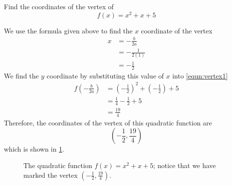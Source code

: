 \begin{myexample}
Find the coordinates of the vertex of
\begin{equation}\label{equn:vertex1}
	f(x) = x^2+x+5
\end{equation}
{}
\end{myexample}
\begin{myProof}
	We use the formula given above to find the $x$ coordinate of the vertex
	\begin{align*}
		x & =  - \frac{b}{2a}   \\
		  & =  - \frac{1}{2(1)} \\
		  & =  -\frac{1}{2}     
	\end{align*} 
	We find the $y$ coordinate by substituting this value of $x$ into \cref{equn:vertex1}
	\begin{align*}
		f\left(-\frac{b}{2a}\right) & =  \left(-\frac{1}{2}\right)^2 +\left(- \frac{1}{2}\right)+5 \\
		                            & =  \frac{1}{4}-\frac{1}{2}+5                                 \\
		                            & =  \frac{19}{4}                                              
	\end{align*} 
	Therefore, the coordinates of the vertex of this quadratic function are 
	\[
		\left( -\frac{1}{2}, \frac{19}{4}\right)
	\]
	which is shown in \cref{fig:quadvertex1}.
			
	\begin{figure}[!ht]
		\centering
		\caption{The quadratic function $f(x)=x^2+x+5$; notice that we have marked the vertex $\left(-\frac{1}{2}, \frac{19}{4}\right)$.}
		\label{fig:quadvertex1}
	\end{figure}
\end{myProof}

\FloatBarrier

